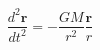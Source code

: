 \documentclass[a4paper,10pt]{article}
\begin{document}
\begin{equation}
\frac{d^2\mathbf{r}}{dt^2}=-\frac{GM}{r^2}\frac{\mathbf{r}}{r}
\end{equation}
\end{document}
